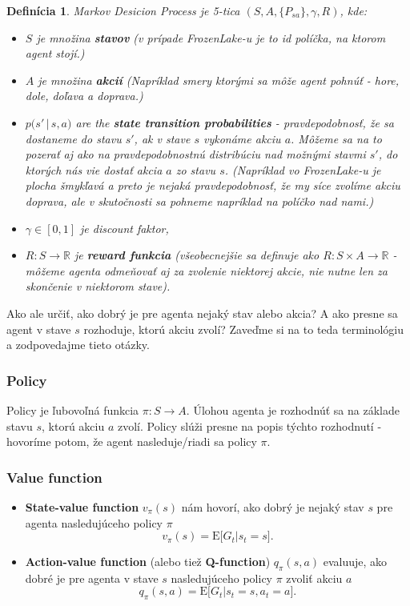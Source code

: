 \documentclass[letterpaper,12pt]{article}
\newtheorem*{defn}{Definícia}
\begin{document}
\begin{defn}
Markov Desicion Process je 5-tica $\left(S, A, \{ P_{sa} \}, \gamma, R\right)$, kde:

\begin{itemize}
\item $S$ je množina \textbf{stavov} (v prípade FrozenLake-u je to id políčka, na ktorom agent stojí.)
\item $A$ je množina \textbf{akcií} (Napríklad smery ktorými sa môže agent pohnúť - hore, dole, doľava a doprava.)
\item $p\big(s'\,|\,s, a\big)$ are the \textbf{state transition probabilities} - pravdepodobnosť, že sa dostaneme do stavu $s'$, ak v stave $s$ vykonáme akciu $a$. Môžeme sa na to pozerať aj ako na pravdepodobnostnú distribúciu nad možnými stavmi $s'$, do ktorých nás vie dostať akcia $a$ zo stavu $s$. (Napríklad vo FrozenLake-u je plocha šmykľavá a preto je nejaká pravdepodobnosť, že my síce zvolíme akciu doprava, ale v skutočnosti sa pohneme napríklad na políčko nad nami.)
\item $\gamma \in [0,1]$ je discount faktor,
\item $R: S \to \mathbb{R}$ je \textbf{reward funkcia} (všeobecnejšie sa definuje ako $R: S \times A \to \mathbb{R}$ - môžeme agenta odmeňovať aj za zvolenie niektorej akcie, nie nutne len za skončenie v niektorom stave).
\end{itemize}
\end{defn}

Ako ale určiť, ako dobrý je pre agenta nejaký stav alebo akcia? A ako presne sa agent v stave $s$ rozhoduje, ktorú akciu zvolí?
Zaveďme si na to teda terminológiu a zodpovedajme tieto otázky.

\subsubsection*{Policy}

\indent\par Policy je ľubovoľná funkcia $\pi: S \to A$. Úlohou agenta je rozhodnúť sa na základe stavu $s$, ktorú akciu $a$ zvolí. Policy slúži presne na popis týchto rozhodnutí - hovoríme potom, že agent nasleduje/riadi sa policy $\pi$.

\subsubsection*{Value function}
\begin{itemize}
	\item \textbf{State-value function} {\boldmath $v_\pi(s)$} nám hovorí, ako dobrý je nejaký stav $s$ pre agenta nasledujúceho policy $\pi$
$$v_\pi(s) = \mathrm{E}\big[G_t|s_t = s\big].$$
		\item \textbf{Action-value function} (alebo tiež \textbf{Q-function}) {\boldmath $q_\pi(s,a)$} evaluuje, ako dobré je pre agenta v stave $s$ nasledujúceho policy $\pi$ zvoliť akciu $a$
$$q_\pi(s,a) = \mathrm{E}\big[G_t|s_t = s, a_t = a\big].$$
\end{itemize}
\end{document}
